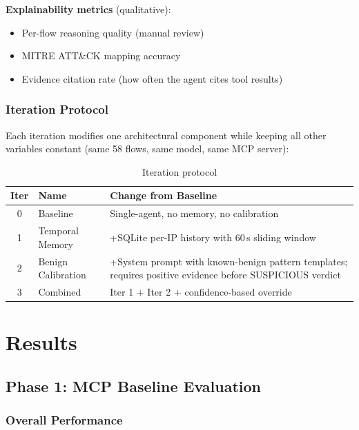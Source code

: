 \documentclass[12pt, a4paper, oneside]{report}
\begin{document}
\textbf{Explainability metrics} (qualitative):
\begin{itemize}
  \item Per-flow reasoning quality (manual review)
  \item MITRE ATT\&CK mapping accuracy
  \item Evidence citation rate (how often the agent cites tool results)
\end{itemize}

\subsection{Iteration Protocol}

Each iteration modifies one architectural component while keeping all other
variables constant (same 58 flows, same model, same MCP server):

\begin{table}[H]
\centering
\caption{Iteration protocol}
\label{tab:iterations}
\begin{tabular}{@{}clp{7cm}@{}}
\toprule
\textbf{Iter} & \textbf{Name} & \textbf{Change from Baseline} \\
\midrule
0 & Baseline         & Single-agent, no memory, no calibration \\
1 & Temporal Memory  & +SQLite per-IP history with 60\,s sliding window \\
2 & Benign Calibration & +System prompt with known-benign pattern templates;
    requires positive evidence before SUSPICIOUS verdict \\
3 & Combined         & Iter 1 + Iter 2 + confidence-based override \\
\bottomrule
\end{tabular}
\end{table}


\chapter{Results}
\label{ch:results}

\section{Phase 1: MCP Baseline Evaluation}
\label{sec:phase1-results-draft}

\subsection{Overall Performance}
\end{document}
